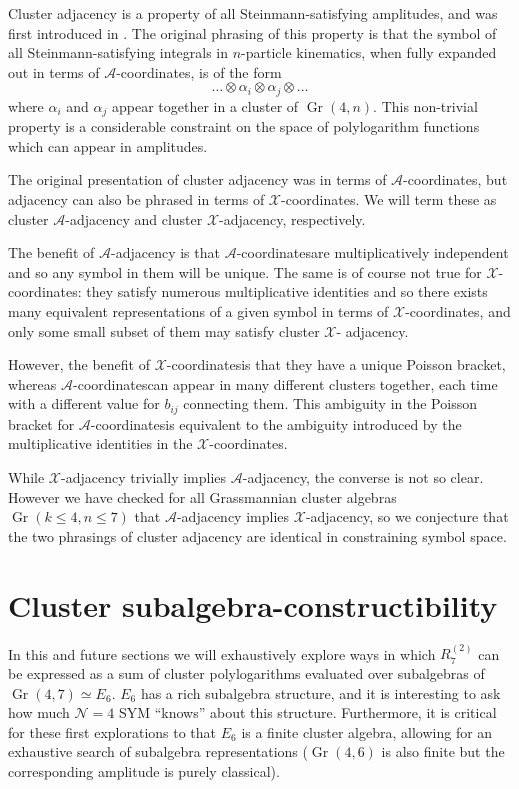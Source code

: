 \documentclass[11pt]{article}
\DeclareMathOperator{\Gr}{Gr}
\def\x{\mathcal{X}}
\def\xcoords{$\mathcal{X}$-coordinates}
\def\a{\mathcal{A}}
\def\acoords{$\mathcal{A}$-coordinates}
\def\flag{{\huge \color{red} \textinterrobang}}
\begin{document}
Cluster adjacency is a property of all Steinmann-satisfying amplitudes, and was first introduced in \cite{Drummond:2017ssj}. The original phrasing of this property is that the symbol of all Steinmann-satisfying integrals in $n$-particle kinematics, when fully expanded out in terms of \acoords, is of the form 
\begin{equation}
	\ldots \otimes \alpha_i \otimes \alpha_j\otimes \ldots 
\end{equation}
where $\alpha_i$ and $\alpha_j$ appear together in a cluster of $\Gr(4,n)$. This non-trivial property is a considerable constraint on the space of polylogarithm functions which can appear in amplitudes. 

The original presentation of cluster adjacency was in terms of \acoords, but adjacency can also be phrased in terms of \xcoords. We will term these as cluster $\a$-adjacency and cluster $\x$-adjacency, respectively. 

The benefit of $\a$-adjacency is that \acoords are multiplicatively independent and so any symbol in them will be unique. The same is of course not true for \xcoords: they satisfy numerous multiplicative identities and so there exists many equivalent representations of a given symbol in terms of \xcoords, and only some small subset of them may satisfy cluster $\x$- adjacency. 

However, the benefit of \xcoords is that they have a unique Poisson bracket, whereas \acoords can appear in many different clusters together, each time with a different value for $b_{ij}$ connecting them. This ambiguity in the Poisson bracket for \acoords is equivalent to the ambiguity introduced by the multiplicative identities in the \xcoords.  

While $\x$-adjacency trivially implies $\a$-adjacency, the converse is not so clear. However we have checked for all Grassmannian cluster algebras $\Gr(k\le4,n\le7)$ that $\a$-adjacency implies $\x$-adjacency, so we conjecture that the two phrasings of cluster adjacency are identical in constraining symbol space. \flag

\section{Cluster subalgebra-constructibility}\label{sec:sub-constructibility} 

In this and future sections we will exhaustively explore ways in which $R^{(2)}_{7}$ can be expressed as a sum of cluster polylogarithms evaluated over subalgebras of $\Gr(4,7) \simeq E_6$. $E_6$ has a rich subalgebra structure, and it is interesting to ask how much $\mathcal{N}=4$ SYM ``knows'' about this structure. Furthermore, it is critical for these first explorations to that $E_6$ is a finite cluster algebra, allowing for an exhaustive search of subalgebra representations ($\Gr(4,6)$ is also finite but the corresponding amplitude is purely classical).
\end{document}
